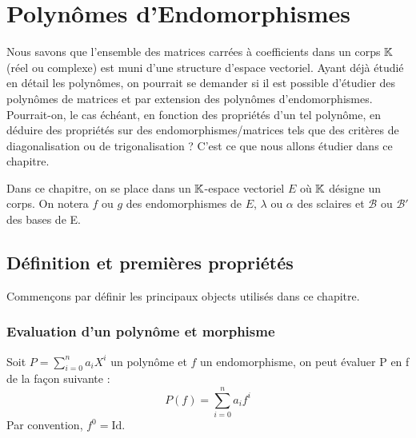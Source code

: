 \chapter{Polynômes d'Endomorphismes}

\justify 

\setlength{\parindent}{0pt}



Nous savons que l'ensemble des matrices carrées à coefficients dans un corps $\mathbb{K}$ (réel ou complexe) est 
muni d'une structure d'espace vectoriel. 
Ayant déjà étudié en détail les polynômes, on pourrait se demander si il est possible d'étudier des polynômes de matrices 
et par extension des polynômes d'endomorphismes. 
Pourrait-on, le cas échéant, en fonction des propriétés d'un tel polynôme, en déduire des propriétés sur des endomorphismes/matrices 
tels que des critères de diagonalisation ou de trigonalisation ?
C'est ce que nous allons étudier dans ce chapitre. 

\vspace{0.3cm}

Dans ce chapitre, on se place dans un $\mathbb{K}$-espace vectoriel $E$ où $\mathbb{K}$ désigne un corps. 
On notera $f$ ou $g$ des endomorphismes de $E$, $\lambda$ ou $\alpha$ des sclaires et $\mathcal{B}$ ou $\mathcal{B}'$ des bases de E. 




\section{Définition et premières propriétés}

Commençons par définir les principaux objects utilisés dans ce chapitre. 

\subsection{Evaluation d'un polynôme et morphisme}

\begin{definition}
    Soit $P = \sum_{i=0}^{n} a_i X^i$ un polynôme et $f$ un endomorphisme, on peut évaluer P en f de la façon suivante :
        \[ P(f) = \sum_{i=0}^{n} a_i f^i \]
    Par convention, $f^0 = \text{Id}$. 
\end{definition}

